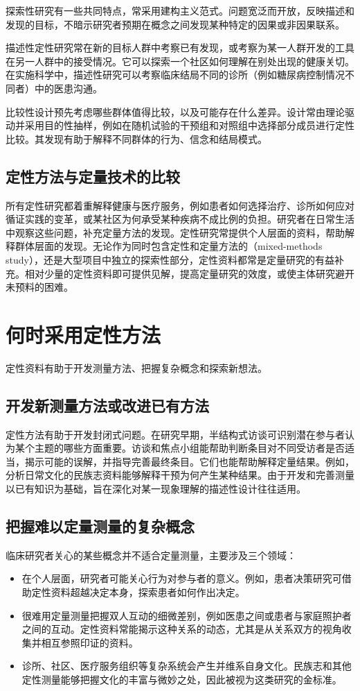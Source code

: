 探索性研究有一些共同特点，常采用建构主义范式。问题宽泛而开放，反映描述和发现的目标，不暗示研究者预期在概念之间发现某种特定的因果或非因果联系。

描述性定性研究常在新的目标人群中考察已有发现，或考察为某一人群开发的工具在另一人群中的接受情况。它可以探索一个社区如何理解在别处出现的健康关切。在实施科学中，描述性研究可以考察临床结局不同的诊所（例如糖尿病控制情况不同者）中的医患沟通。

比较性设计预先考虑哪些群体值得比较，以及可能存在什么差异。设计常由理论驱动并采用目的性抽样，例如在随机试验的干预组和对照组中选择部分成员进行定性比较。其发现有助于解释不同群体的行为、信念和结局模式。

\subsection{定性方法与定量技术的比较}
所有定性研究都着重解释健康与医疗服务，例如患者如何选择治疗、诊所如何应对循证实践的变革，或某社区为何承受某种疾病不成比例的负担。研究者在日常生活中观察这些问题，补充定量方法的发现。定性研究常提供个人层面的资料，帮助解释群体层面的发现。无论作为同时包含定性和定量方法的（mixed-methods study），还是大型项目中独立的探索性部分，定性资料都常是定量研究的有益补充。相对少量的定性资料即可提供见解，提高定量研究的效度，或使主体研究避开未预料的困难。

\section{何时采用定性方法}
定性资料有助于开发测量方法、把握复杂概念和探索新想法。

\subsection{开发新测量方法或改进已有方法}
定性方法有助于开发封闭式问题。在研究早期，半结构式访谈可识别潜在参与者认为某个主题的哪些方面重要。访谈和焦点小组能帮助判断条目对不同受访者是否适当，揭示可能的误解，并指导完善最终条目。它们也能帮助解释定量结果。例如，分析日常文化的民族志资料能够解释干预为何产生某种结果。由于开发和完善测量以已有知识为基础，旨在深化对某一现象理解的描述性设计往往适用。

\subsection{把握难以定量测量的复杂概念}
临床研究者关心的某些概念并不适合定量测量，主要涉及三个领域：
\begin{itemize}
\item 在个人层面，研究者可能关心行为对参与者的意义。例如，患者决策研究可借助定性资料超越决定本身，探索患者如何作出决定。
\item 很难用定量测量把握双人互动的细微差别，例如医患之间或患者与家庭照护者之间的互动。定性资料常能揭示这种关系的动态，尤其是从关系双方的视角收集并相互参照印证的资料。
\item 诊所、社区、医疗服务组织等复杂系统会产生并维系自身文化。民族志和其他定性测量能够把握文化的丰富与微妙之处，因此被视为这类研究的金标准。
\end{itemize}

